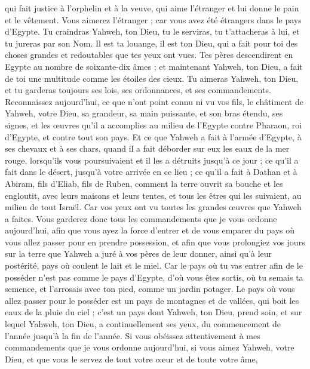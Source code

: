 \begin{multicols}{2}
qui fait justice à l'orphelin et à la veuve, qui aime l'étranger et lui donne le pain et le vêtement.
Vous aimerez l'étranger ; car vous avez été étrangers dans le pays d'Egypte.
Tu craindras Yahweh, ton Dieu, tu le serviras, tu t'attacheras à lui, et tu jureras par son Nom.
Il est ta louange, il est ton Dieu, qui a fait pour toi des choses grandes et redoutables que tes yeux ont vues.
Tes pères descendirent en Egypte au nombre de soixante-dix âmes ; et maintenant Yahweh, ton Dieu, a fait de toi une multitude comme les étoiles des cieux.
\VerseOne{}Tu aimeras Yahweh, ton Dieu, et tu garderas toujours ses lois, ses ordonnances, et ses commandements.
Reconnaissez aujourd'hui, ce que n’ont point connu ni vu vos fils, le châtiment de Yahweh, votre Dieu, sa grandeur, sa main puissante, et son bras étendu,
ses signes, et les œuvres qu'il a accomplies au milieu de l'Egypte contre Pharaon, roi d'Egypte, et contre tout son pays.
Et ce que Yahweh a fait à l'armée d'Egypte, à ses chevaux et à ses chars, quand il a fait déborder sur eux les eaux de la mer rouge, lorsqu'ils vous poursuivaient et il les a détruits jusqu'à ce jour ;
ce qu'il a fait dans le désert, jusqu'à votre arrivée en ce lieu ;
ce qu'il a fait à Dathan et à Abiram, fils d'Eliab, fils de Ruben, comment la terre ouvrit sa bouche et les engloutit, avec leurs maisons et leurs tentes, et tous les êtres qui les suivaient, au milieu de tout Israël.
Car vos yeux ont vu toutes les grandes œuvres que Yahweh a faites.
Vous garderez donc tous les commandements que je vous ordonne aujourd'hui, afin que vous ayez la force d’entrer et de vous emparer du pays où vous allez passer pour en prendre possession,
et afin que vous prolongiez vos jours sur la terre que Yahweh a juré à vos pères de leur donner, ainsi qu’à leur postérité, pays où coulent le lait et le miel.
Car le pays où tu vas entrer afin de le posséder n'est pas comme le pays d'Egypte, d’où vous êtes sortis, où tu semais ta semence, et l'arrosais avec ton pied, comme un jardin potager.
Le pays où vous allez passer pour le posséder est un pays de montagnes et de vallées, qui boit les eaux de la pluie du ciel ;
c'est un pays dont Yahweh, ton Dieu, prend soin, et sur lequel Yahweh, ton Dieu, a continuellement ses yeux, du commencement de l'année jusqu'à la fin de l’année.
Si vous obéissez attentivement à mes commandements que je vous ordonne aujourd'hui, si vous aimez Yahweh, votre Dieu, et que vous le servez de tout votre cœur et de toute votre âme,

\end{multicols}

